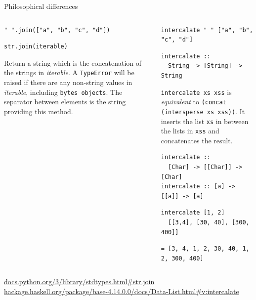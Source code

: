\documentclass[8pt]{beamer}
\begin{document}
\begin{frame}[fragile]{Philosophical differences}

\pause

\begin{columns}%
\begin{column}{.48\textwidth}
\begin{verbatim}
" ".join(["a", "b", "c", "d"])
\end{verbatim}
\pause
\begin{verbatim}
str.join(iterable)
\end{verbatim}

Return a string which is the concatenation of the strings in \emph{iterable}. A
\verb|TypeError| will be raised if there are any non-string values in \emph{iterable},
including \verb|bytes objects|. The separator between elements is the string providing
this method.


\end{column}
%
\begin{column}{.48\textwidth}
\pause
\begin{verbatim}
intercalate " " ["a", "b", "c", "d"]
\end{verbatim}

\pause
\begin{verbatim}
intercalate :: 
  String -> [String] -> String
\end{verbatim}

\pause
\verb|intercalate xs xss| is \emph{equivalent} to \verb|(concat (intersperse xs xss))|.
It inserts the list \verb|xs| in between the lists in \verb|xss| and concatenates the result.

\pause

\begin{verbatim}
intercalate :: 
  [Char] -> [[Char]] -> [Char]
intercalate :: [a] -> [[a]] -> [a]
\end{verbatim}
\pause

\begin{verbatim}
intercalate [1, 2] 
  [[3,4], [30, 40], [300, 400]]
\end{verbatim}
\pause
\begin{verbatim}
= [3, 4, 1, 2, 30, 40, 1, 2, 300, 400]
\end{verbatim}

\end{column}
\end{columns}

\pause
{\tiny \url{docs.python.org/3/library/stdtypes.html#str.join}}
{\tiny \url{hackage.haskell.org/package/base-4.14.0.0/docs/Data-List.html#v:intercalate}}

\end{frame}
\end{document}
